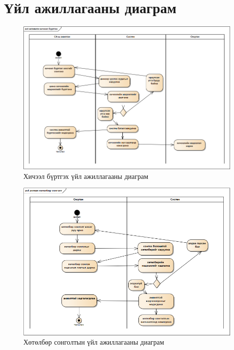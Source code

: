 \newpage
\section{Үйл ажиллагааны диаграм}
\begin{figure}
	\centering
	\includegraphics[angle=90, scale=0..]{Diagrams/activity-hicheelbvrtgel}
	\caption[Хичээл бүртгэх үйл ажиллагааны диаграм]{Хичээл бүртгэх үйл ажиллагааны диаграм}
	\label{text}
\end{figure}
\begin{figure}
	\centering
	\includegraphics[angle=90, scale=0.65]{Diagrams/activity-hutulbursongolt}
	\caption[Хөтөлбөр сонголтын үйл ажиллагааны диаграм]{Хөтөлбөр сонголтын үйл ажиллагааны диаграм}
	\label{text}
\end{figure}


